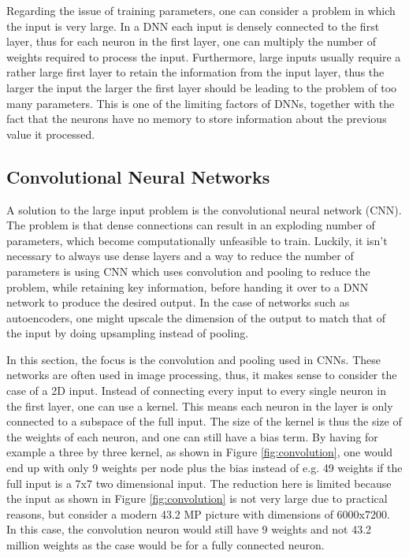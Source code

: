 \documentclass[12pt,a4paper]{article} %
\numberwithin{equation}{section}
\begin{document}
		Regarding the issue of training parameters, one can consider a problem in which the input is very large. In a DNN each input is densely connected to the first layer, thus for each neuron in the first layer, one can multiply the number of weights required to process the input. Furthermore, large inputs usually require a rather large first layer to retain the information from the input layer, thus the larger the input the larger the first layer should be leading to the problem of too many parameters. This is one of the limiting factors of DNNs, together with the fact that the neurons have no memory to store information about the previous value it processed.
		
		\subsection{Convolutional Neural Networks}
		A solution to the large input problem is the convolutional neural network (CNN). The problem is that dense connections can result in an exploding number of parameters, which become computationally unfeasible to train. Luckily, it isn't necessary to always use dense layers and a way to reduce the number of parameters is using CNN which uses convolution and pooling to reduce the problem, while retaining key information, before handing it over to a DNN network to produce the desired output. In the case of networks such as autoencoders, one might upscale the dimension of the output to match that of the input by doing upsampling instead of pooling.
		
		In this section, the focus is the convolution and pooling used in CNNs. These networks are often used in image processing, thus, it makes sense to consider the case of a 2D input. Instead of connecting every input to every single neuron in the first layer, one can use a kernel. This means each neuron in the layer is only connected to a subspace of the full input. The size of the kernel is thus the size of the weights of each neuron, and one can still have a bias term. By having for example a three by three kernel, as shown in Figure \ref{fig:convolution}, one would end up with only 9 weights per node plus the bias instead of e.g. 49 weights if the full input is a 7x7 two dimensional input. The reduction here is limited because the input as shown in Figure \ref{fig:convolution} is not very large due to practical reasons, but consider a modern 43.2 MP picture with dimensions of 6000x7200. In this case, the convolution neuron would still have 9 weights and not 43.2 million weights as the case would be for a fully connected neuron.  
		
\end{document}
